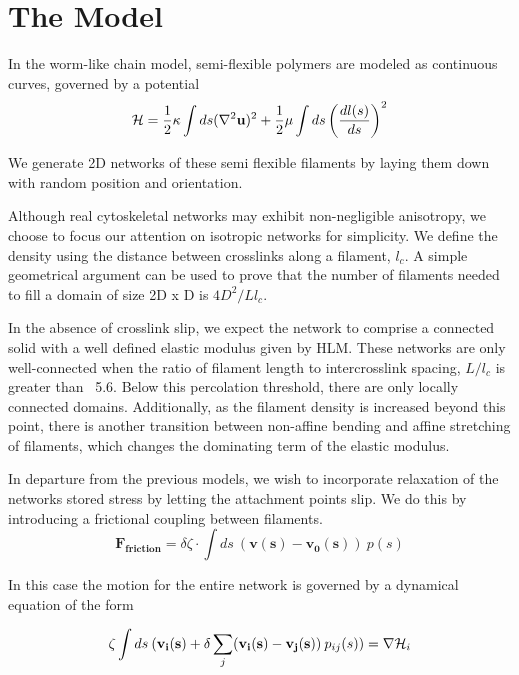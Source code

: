 \documentclass[prb,11pt]{revtex4-1}
\begin{document}
\section{The Model}

In the worm-like chain model, semi-flexible polymers are modeled as continuous curves, governed by a potential 
\begin{equation}
{\cal H} =\frac{1}{2}\kappa \int ds(\nabla^2\mathbf{u})^2 + \frac{1}{2}\mu \int ds \left ( \frac{dl(s) }{ds} \right )^2
\end{equation}

We generate 2D networks of these semi flexible filaments by laying them down with random position and orientation.  

Although real cytoskeletal networks may exhibit non-negligible anisotropy, we choose to focus our attention on isotropic networks for simplicity.  We define the density using the distance between crosslinks along a filament, $l_c$. A simple geometrical argument can be used to prove that the number of filaments needed to fill a domain of size 2D x D is $4D^2/Ll_c$. 

In the absence of crosslink slip, we expect the network to comprise a connected solid with a well defined elastic modulus given by HLM.  These networks are only well-connected when the ratio of filament length to intercrosslink spacing, $L/l_c$ is greater than ~5.6.  Below this percolation threshold, there are only locally connected domains.  Additionally, as the filament density is increased beyond this point, there is another transition between non-affine bending and affine stretching of filaments, which changes the dominating term of the elastic modulus.

In departure from the previous models, we wish to incorporate relaxation of the networks stored stress by letting the attachment points slip.  We do this by introducing a frictional coupling between filaments.
\begin{equation}
\mathbf{F_{friction}} = \delta \zeta \cdot \int ds \: (\mathbf{v(s)}-\mathbf{v_0(s)}) \: p(s)
\end{equation}

In this case the motion for the entire network is governed by a dynamical equation of the form

\begin{equation}
\zeta \int ds \: (\mathbf{v_i(s)} + \delta \sum _j(\mathbf{v_i(s)}-\mathbf{v_j(s)}) \: p_{ij}(s))= \nabla {\cal H}_i
\end{equation}
\end{document}
